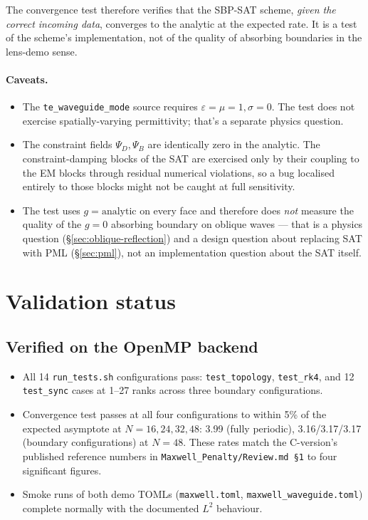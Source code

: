 \documentclass[11pt]{article}
\newcommand{\eps}{\varepsilon}
\begin{document}
The convergence test therefore verifies that the SBP-SAT scheme,
\emph{given the correct incoming data}, converges to the analytic
at the expected rate.  It is a test of the scheme's
implementation, not of the quality of absorbing boundaries in
the lens-demo sense.

\paragraph{Caveats.}
\begin{itemize}[itemsep=2pt,topsep=2pt]
  \item The \texttt{te\_waveguide\_mode} source requires
        $\eps = \mu = 1, \sigma = 0$.  The test does not
        exercise spatially-varying permittivity; that's a separate
        physics question.
  \item The constraint fields $\Psi_D, \Psi_B$ are identically
        zero in the analytic.  The constraint-damping blocks of
        the SAT are exercised only by their coupling to the EM
        blocks through residual numerical violations, so a bug
        localised entirely to those blocks might not be caught at
        full sensitivity.
  \item The test uses $g = \text{analytic}$ on every face and
        therefore does \emph{not} measure the quality of the
        $g = 0$ absorbing boundary on oblique waves --- that is a
        physics question (\S\ref{sec:oblique-reflection}) and a
        design question about replacing SAT with PML
        (\S\ref{sec:pml}), not an implementation question about
        the SAT itself.
\end{itemize}

\section{Validation status}
\label{sec:status}

\subsection{Verified on the OpenMP backend}

\begin{itemize}[itemsep=2pt,topsep=2pt]
  \item All 14 \texttt{run\_tests.sh} configurations pass:
        \texttt{test\_topology}, \texttt{test\_rk4}, and 12
        \texttt{test\_sync} cases at 1--27 ranks across three
        boundary configurations.
  \item Convergence test passes at all four configurations to
        within 5\% of the expected asymptote at $N=16, 24, 32,
        48$: 3.99 (fully periodic), 3.16/3.17/3.17 (boundary
        configurations) at $N=48$.  These rates match the
        C-version's published reference numbers in
        \texttt{Maxwell\_Penalty/Review.md \S 1} to four
        significant figures.
  \item Smoke runs of both demo TOMLs (\texttt{maxwell.toml},
        \texttt{maxwell\_waveguide.toml}) complete normally with
        the documented $L^2$ behaviour.
\end{itemize}
\end{document}
